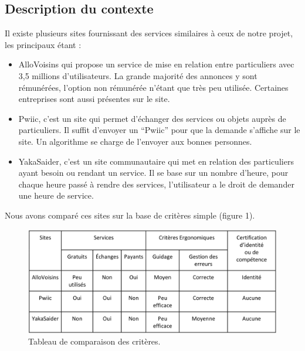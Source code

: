\documentclass[a4paper,11pt]{article}
\begin{document}



\subsection{Description du contexte}

Il existe plusieurs sites fournissant des services similaires à ceux de notre projet, les principaux étant :\\

\begin{itemize}
  \item AlloVoisins qui propose un service de mise en relation entre particuliers avec 3,5 millions
  d'utilisateurs. La grande majorité des annonces y sont rémunérées, l’option non rémunérée
  n’étant que très peu utilisée. Certaines entreprises sont aussi présentes sur le site.

  \item Pwiic, c’est un site qui permet d’échanger des services ou objets auprès de particuliers. Il suffit
  d’envoyer un “Pwiic” pour que la demande s’affiche sur le site. Un algorithme se charge de
  l’envoyer aux bonnes personnes.

  \item YakaSaider, c’est un site communautaire qui met en relation des particuliers ayant besoin ou
  rendant un service. Il se base sur un nombre d’heure, pour chaque heure passé à rendre des
  services, l’utilisateur a le droit de demander une heure de service.
\end{itemize}

Nous avons comparé ces sites sur la base de critères simple (figure 1).

\begin{figure}[H]
  \includegraphics[width=\linewidth]{images/tableau-ergo.png}
  \caption{Tableau de comparaison des critères.}
  \label{fig:table1}
\end{figure}
\end{document}
